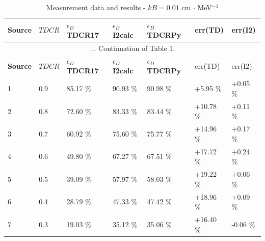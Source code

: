 \documentclass[12pt]{iopart}
\begin{document}
\begingroup
\footnotesize
\begin{longtable}[l]{| p{} | p{} |p{} | p{} |p{} |p{} |p{} |} 
\caption{Measurement data and results - $kB = 0.01$ cm $\cdot$ MeV$^{-1}$}
\label{Table1} \\ 
\hline
\textbf{Source} & \textbf{$TDCR$} & \textbf{$\epsilon_{D}$ TDCR17} & \textbf{$\epsilon_{D}$ I2calc} & \textbf{$\epsilon_{D}$ TDCRPy} & err(TD)& err(I2) \\ 
\endfirsthead
\multicolumn{7}{c}{... Continuation of Table 1.}\\ 
\hline
 \textbf{Source} & \textbf{$TDCR$} & \textbf{$\epsilon_{D}$ TDCR17} & \textbf{$\epsilon_{D}$ I2calc} & \textbf{$\epsilon_{D}$ TDCRPy} & err(TD)& err(I2) \\   \hline 
\endhead
\hline
 1 &  0.9  & 85.17 \% &  90.93 \% & 90.98 \% &  +5.95 \%  & +0.05 \% \\
 2 &  0.8  & 72.60 \% &  83.33 \% & 83.44 \% &  +10.78 \% & +0.11 \% \\
 3 &  0.7  & 60.92 \% &  75.60 \% & 75.77 \% &  +14.96 \% & +0.17 \% \\
 4 &  0.6  & 49.80 \% &  67.27 \% & 67.51 \% &  +17.72 \% & +0.24 \% \\
 5 &  0.5  & 39.09 \% &  57.97 \% & 58.03 \% &  +19.22 \% & +0.06 \% \\
 6 &  0.4  & 28.79 \% &  47.33 \% & 47.42 \% &  +18.96 \% & +0.09 \% \\
 7 &  0.3  & 19.03 \% &  35.12 \% & 35.06 \% &  +16.40 \% & -0.06 \% \\
\hline
\end{longtable} 
\endgroup
\end{document}
